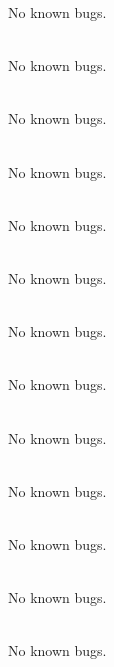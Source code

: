 \begin{DoxyRefList}
No known bugs.  
\item[File \doxylink{global_8cpp}{global.cpp} ]\hfill \\
\label{bug__bug000062}%
%
No known bugs.  
\item[File \doxylink{global_8hpp}{global.hpp} ]\hfill \\
\label{bug__bug000018}%
%
No known bugs.  
\item[File \doxylink{gmst_8cpp}{gmst.cpp} ]\hfill \\
\label{bug__bug000063}%
%
No known bugs.  
\item[File \doxylink{gmst_8hpp}{gmst.hpp} ]\hfill \\
\label{bug__bug000019}%
%
No known bugs.  
\item[File \doxylink{hgibbs_8cpp}{hgibbs.cpp} ]\hfill \\
\label{bug__bug000064}%
%
No known bugs.  
\item[File \doxylink{hgibbs_8hpp}{hgibbs.hpp} ]\hfill \\
\label{bug__bug000020}%
%
No known bugs.  
\item[File \doxylink{_i_e_r_s_8cpp}{IERS.cpp} ]\hfill \\
\label{bug__bug000065}%
%
No known bugs.  
\item[File \doxylink{_i_e_r_s_8hpp}{IERS.hpp} ]\hfill \\
\label{bug__bug000021}%
%
No known bugs.  
\item[File \doxylink{_j_p_l___eph___d_e430_8cpp}{JPL\+\_\+\+Eph\+\_\+\+DE430.cpp} ]\hfill \\
\label{bug__bug000066}%
%
No known bugs.  
\item[File \doxylink{_j_p_l___eph___d_e430_8hpp}{JPL\+\_\+\+Eph\+\_\+\+DE430.hpp} ]\hfill \\
\label{bug__bug000022}%
%
No known bugs.  
\item[File \doxylink{_legendre_8cpp}{Legendre.cpp} ]\hfill \\
\label{bug__bug000067}%
%
No known bugs.  
\item[File \doxylink{_legendre_8hpp}{Legendre.hpp} ]\hfill \\
\label{bug__bug000023}%
%
No known bugs.  
\item[File \doxylink{_l_t_c_8cpp}{LTC.cpp} ]\hfill \\

\end{DoxyRefList}
